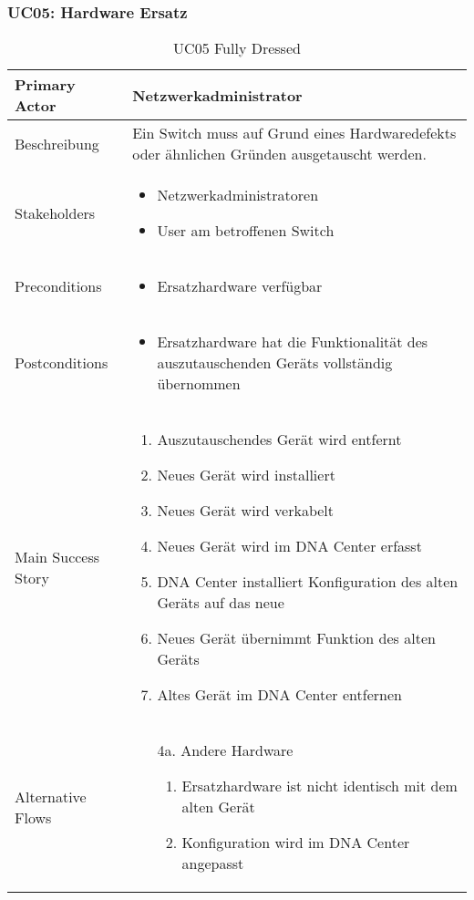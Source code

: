 \subsubsection{UC05: Hardware Ersatz}
\begin{table}[H]
	\centering
	\begin{tabularx}{\textwidth}{l | X}
		Primary Actor   & Netzwerkadministrator        \\
		\hline
		Beschreibung   & Ein Switch muss auf Grund eines Hardwaredefekts oder ähnlichen Gründen ausgetauscht werden.  \\ 
		\hline
		Stakeholders       & 
		\begin{itemize}
			\item Netzwerkadministratoren
			\item User am betroffenen Switch
		\end{itemize} \\ 
		Preconditions      &
		\begin{itemize}	
			\item Ersatzhardware verfügbar
		\end{itemize}  \\
		\hline
		Postconditions     & 
		\begin{itemize}	
			\item Ersatzhardware hat die Funktionalität des auszutauschenden Geräts vollständig übernommen
		\end{itemize}  \\
		\hline
		Main Success Story & 
		\begin{enumerate}
			\item Auszutauschendes Gerät wird entfernt
			\item Neues Gerät wird installiert
			\item Neues Gerät wird verkabelt
			\item Neues Gerät wird im DNA Center erfasst
			\item DNA Center installiert Konfiguration des alten Geräts auf das neue
			\item Neues Gerät übernimmt Funktion des alten Geräts
			\item Altes Gerät im DNA Center entfernen
		\end{enumerate}
		\\
		\hline
		Alternative Flows  & 
		\begin{itemize}
			\item[4a.] Andere Hardware
			\begin{enumerate}
				\item Ersatzhardware ist nicht identisch mit dem alten Gerät
				\item Konfiguration wird im DNA Center angepasst
			\end{enumerate} 
		\end{itemize}
	\end{tabularx}
	\caption{UC05 Fully Dressed}
	\label{tab:UC05}
\end{table}

